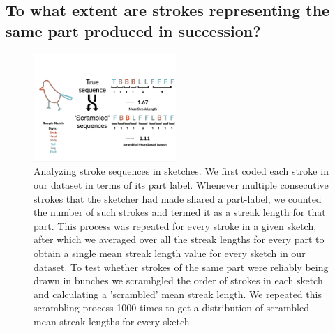 \documentclass[10pt,letterpaper]{article}
\begin{document}

\subsection{To what extent are strokes representing the same part produced in succession?}

\begin{figure}
\centering
\includegraphics[width=0.48\textwidth]{figures/part_sequence.pdf}
\caption{Analyzing stroke sequences in sketches. We first coded each stroke in our dataset in terms of its part label. Whenever multiple consecutive strokes that the sketcher had made shared a part-label, we counted the number of such strokes and termed it as a streak length for that part. This process was repeated for every stroke in a given sketch, after which we averaged over all the streak lengths for every part to obtain a single mean streak length value for every sketch in our dataset. To test whether strokes of the same part were reliably being drawn in bunches we scrambgled the order of strokes in each sketch and calculating a 'scrambled' mean streak length. We repeated this scrambling process 1000 times to get a distribution of scrambled mean streak lengths for every sketch.}
\label{stroke_sequence_fig}
\end{figure}
\end{document}
